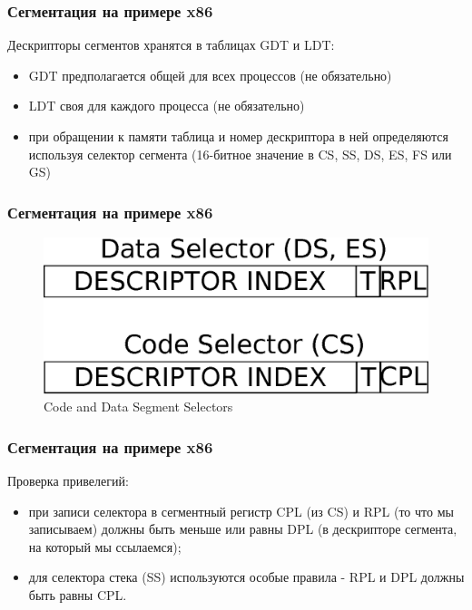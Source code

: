 \begin{frame}
\frametitle{Сегментация на примере x86}

Дескрипторы сегментов хранятся в таблицах GDT и LDT:
\begin{itemize}
  \item GDT предполагается общей для всех процессов (не обязательно)
  \item LDT своя для каждого процесса (не обязательно)
  \item при обращении к памяти таблица и номер дескриптора в ней определяются используя селектор сегмента (16-битное значение в CS, SS, DS, ES, FS или GS)
\end{itemize}
\end{frame}

\begin{frame}
\frametitle{Сегментация на примере x86}

\begin{figure}
  \centering\includegraphics[width=.9\linewidth]{arch-segs}
  \caption{Code and Data Segment Selectors}
\end{figure}

\end{frame}

\begin{frame}
\frametitle{Сегментация на примере x86}

Проверка привелегий:
\begin{itemize}
  \item при записи селектора в сегментный регистр CPL (из CS) и RPL (то что мы записываем) должны быть меньше или равны DPL (в дескрипторе сегмента, на который мы ссылаемся);
  \item для селектора стека (SS) используются особые правила - RPL и DPL должны быть равны CPL.
\end{itemize}
\end{frame}
